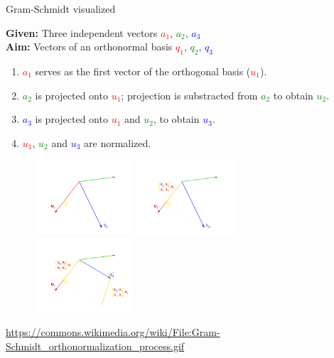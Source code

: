 \documentclass[11pt,compress,t,notes=noshow, xcolor=table]{beamer}
\begin{document}
\begin{vbframe}{Gram-Schmidt visualized}
\framebreak

\begin{scriptsize}

\textbf{Given:} Three independent vectors \textcolor{red}{$a_1$}, \textcolor{green}{$a_2$}, \textcolor{blue}{$a_3$} \\
\textbf{Aim:} Vectors of an orthonormal basis \textcolor{red}{$q_1$}, \textcolor{green}{$q_2$}, \textcolor{blue}{$q_3$}

\begin{enumerate}
  \item<2-> \textcolor{red}{$a_1$} serves as the first vector of the orthogonal basis (\textcolor{red}{$u_1$}).
  \item<3-> \textcolor{green}{$a_2$} is projected onto \textcolor{red}{$u_1$}; projection is substracted from \textcolor{green}{$a_2$}
        to obtain \textcolor{green}{$u_2$}.
  \item \textcolor{blue}{$a_3$} is projected onto \textcolor{red}{$u_1$} and \textcolor{green}{$u_2$},
        to obtain \textcolor{blue}{$u_3$}.
  \item<4-> \textcolor{red}{$u_1$}, \textcolor{green}{$u_2$} and \textcolor{blue}{$u_3$} are normalized.
\end{enumerate}

\end{scriptsize}

\begin{figure}
  \centering
  \includegraphics[width=0.33\textwidth]{figure_man/frame_066_delay-3s.png}
  \includegraphics[width=0.33\textwidth]{figure_man/frame_069_delay-3s.png}
  \includegraphics[width=0.33\textwidth]{figure_man/frame_089_delay-4s.png}
\end{figure}
\tiny{\url{https://commons.wikimedia.org/wiki/File:Gram-Schmidt_orthonormalization_process.gif}}


\end{vbframe}
\end{document}

